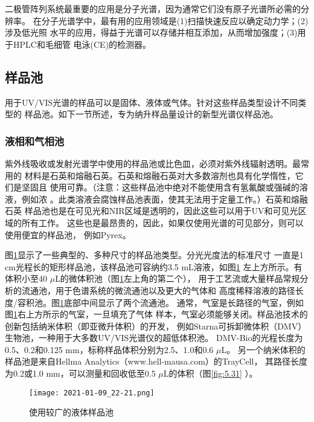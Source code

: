 二极管阵列系统最重要的应用是分子光谱，因为通常它们没有原子光谱所必需的分辨率。
在分子光谱学中，最有用的应用领域是(1)扫描快速反应以确定动力学；(2)涉及低光照
水平的应用，得益于光谱可以存储并相互添加，从而增加强度；(3)用于HPLC和毛细管
电泳(CE)的检测器。
\subsection{样品池}
用于UV/VIS光谱的样品可以是固体、液体或气体。针对这些样品类型设计不同类型的
样品池。如下一节所述，专为纳升样品量设计的新型光谱仪样品池。
\subsubsection{液相和气相池}
紫外线吸收或发射光谱学中使用的样品池或比色皿，必须对紫外线辐射透明。最常用的
材料是石英和熔融石英。石英和熔融石英对大多数溶剂也具有化学惰性，它们是坚固且
使用可靠。（注意：这些样品池中绝对不能使用含有氢氟酸或强碱的溶液，例如浓
。此类溶液会腐蚀样品池表面，使其无法用于定量工作。）石英和熔融石英
样品池也是在可见光和NIR区域是透明的，因此这些可以用于UV和可见光区域的所有工作。
这些也是最昂贵的，因此，如果仅使用光谱的可见部分，则可以使用便宜的样品池，
例如Pyrex。

图\ref{fig:5.26}显示了一些典型的、多种尺寸的样品池类型。分光光度法的标准尺寸
一直是1 cm光程长的矩形样品池，该样品池可容纳约3.5 mL溶液，如图\ref{fig:5.26}
左上方所示。有体积小至40 $\mu$L的微体积池（图\ref{fig:5.26}左上角的第二个），
用于工艺流或大量样品常规分析的流通池，用于色谱系统的微流通池以及更大的气体和
高度稀释溶液的路径长度/容积池。图\ref{fig:5.26}底部中间显示了两个流通池。
通常，气室是长路径的气室，例如图\ref{fig:5.26}右上方所示的气室，一旦填充了气体
样本，气室必须能够关闭。样品池技术的创新包括纳米体积（即亚微升体积）的开发，
例如Starna可拆卸微体积（DMV）生物池，一种用于大多数UV/VIS光谱仪的超低体积池。
DMV-Bio的光程长度为0.5、0.2和0.125 mm，标称样品体积分别为2.5、1.0和0.6 $\mu$L。
另一个纳米体积的样品池是来自Hellma Analytics（www.hell-mausa.com）的TrayCell，
其路径长度为0.2或1.0 mm，可以测量和回收低至0.5 $\mu$L的体积（图\ref{fig:5.31}
）。
\begin{figure}[htpb]
    \centering
    \texttt{[image: 2021-01-09\_22-21.png]}
    \caption{使用较广的液体样品池}
    \label{fig:5.26}
\end{figure}

